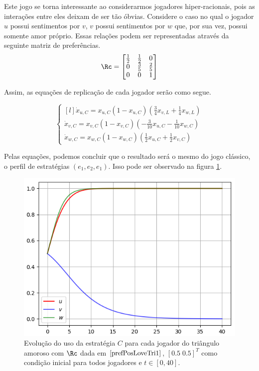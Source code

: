 Este jogo se torna interessante ao considerarmos jogadores hiper-racionais, pois as interações entre eles deixam de ser tão óbvias. Considere o caso no qual o jogador $u$ possui sentimentos por $v$, $v$ possui sentimentos por $w$ que, por sua vez, possui somente amor próprio. Essas relações podem ser representadas através da seguinte matriz de preferências.
\begin{equation}
    \label{prefPosLoveTri1}
    \Rc=
    \begin{bmatrix}
        \frac{1}{2} & \frac{1}{2} & 0\\ 
        0 & \frac{3}{5} & \frac{2}{5} \\
        0 & 0 & 1
    \end{bmatrix}
\end{equation}

Assim, as equações de replicação de cada jogador serão como segue.

\begin{equation}
    \label{EqRepLoveTri1}
    \left\{\begin{matrix*}[l]
        \dot{x}_{u,C}=x_{u,C}(1-x_{u,C})\left(\frac{3}{4}x_{v,L}+\frac{1}{4}x_{w,L}\right) \\
        \dot{x}_{v,C}=x_{v,C}(1-x_{v,C})\left(-\frac{3}{10}x_{u,C}-\frac{1}{10}x_{w,C}\right) \\
        \dot{x}_{w,C}=x_{w,C}(1-x_{w,C})\left(\frac{1}{2}x_{u,C}+\frac{1}{2}x_{v,C}\right)
    \end{matrix*}\right.
\end{equation}

Pelas equações, podemos concluir que o resultado será o mesmo do jogo clássico, o perfil de estratégias $(e_1,e_2,e_1)$. Isso pode ser observado na figura \ref{fig:love_tri1.png}.

\begin{figure}[h]
    \caption{Evolução do uso da estratégia $C$ para cada jogador do triângulo amoroso com $\Rc$ dada em $\eqref{prefPosLoveTri1}$,  $[0.5 \; 0.5]^T$ como condição inicial para todos jogadores e $t\in[0,40]$.}
    \centerline{\includegraphics[scale=0.8]{./img/love_tri1.png}}
    \label{fig:love_tri1.png}
\end{figure}

